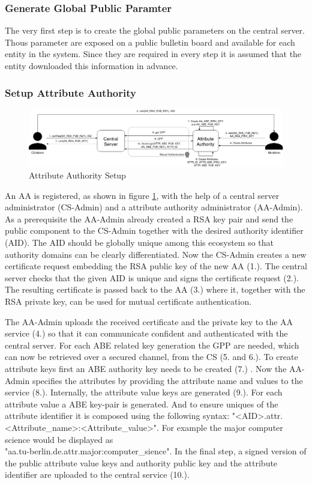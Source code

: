 \subsubsection{Generate Global Public Paramter}
The very first step is to create the global public parameters on the central server. Thous parameter are exposed on a public bulletin board and available for each entity in the system. Since they are required in every step it is assumed that the entity downloaded this information in advance. 

\subsubsection{Setup Attribute Authority}
\begin{figure}[!h]
\centering
    \includegraphics[width=\linewidth]{img/aa_setup.png}
    \caption{Attribute Authority Setup}
    \label{fig:aa-setup}
\end{figure}
An AA is registered, as shown in figure \ref{fig:aa-setup}, with the help of a central server administrator (CS-Admin) and a attribute authority administrator (AA-Admin). As a prerequisite the AA-Admin already created a RSA key pair and send the public component to the CS-Admin together with the desired authority identifier (AID). The AID should be globally unique among this ecosystem so that authority domains can be clearly differentiated. Now the CS-Admin creates a new certificate request embedding the RSA public key of the new AA (1.). The central server checks that the given AID is unique and signs the certificate request (2.). The resulting certificate is passed back to the AA (3.) where it, together with the RSA private key, can be used for mutual certificate authentication. 

The AA-Admin uploads the received certificate and the private key to the AA service (4.) so that it can communicate confident and authenticated with the central server. For each ABE related key generation the GPP are needed, which can now be retrieved over a secured channel, from the CS (5. and 6.). To create attribute keys first an ABE authority key needs to be created (7.) . Now the AA-Admin specifies the attributes by providing the attribute name and values to the service (8.). Internally, the attribute value keys are generated (9.). For each attribute value a ABE key-pair is generated. And to ensure uniques of the attribute identifier it is composed using the following syntax: "<AID>.attr.<Attribute\_name>:<Attribute\_value>". For example the major computer science would be displayed as \\"aa.tu-berlin.de.attr.major:computer\_sience". In the final step, a signed version of the public attribute value keys and authority public key and the attribute identifier are uploaded to the central service (10.).

